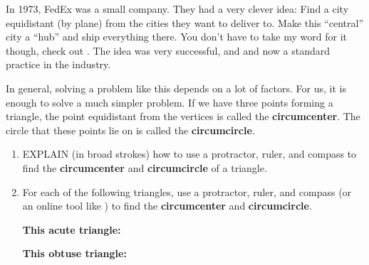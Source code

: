 \documentclass[nooutcomes,noauthor,hints,handout]{ximera}
\begin{document}
\begin{question}
  In 1973, FedEx was a small company. They had a very clever idea:
  Find a city equidistant (by plane) from the cities they want to
  deliver to.  Make this ``central'' city a ``hub'' and ship
  everything there.  You don't have to take my word for it though,
  check out .
  The idea was very successful, and and now a standard practice in the
  industry.

  In general, solving a problem like this depends on a lot of
  factors. For us, it is enough to solve a much simpler problem. If we
  have three points forming a triangle, the point equidistant from the
  vertices is called the \textbf{circumcenter}. The circle that these
  points lie on is called the \textbf{circumcircle}.
  \begin{enumerate}
  \item EXPLAIN (in broad strokes) how to use a protractor, ruler, and
    compass to find the \textbf{circumcenter} and
    \textbf{circumcircle} of a triangle.
  \item For each of the following triangles, use a protractor, ruler,
    and compass (or an online tool like
    ) to
    find the \textbf{circumcenter} and \textbf{circumcircle}.


    \textbf{This acute triangle:}
    

    \vspace{1.5in}
    


   \begin{center}
    \end{center}


   \newpage
      
    \textbf{This obtuse triangle:}

      
          \vspace*{2.5in}

          \begin{center}
          \end{center}


\end{enumerate}
\end{question}
\end{document}
